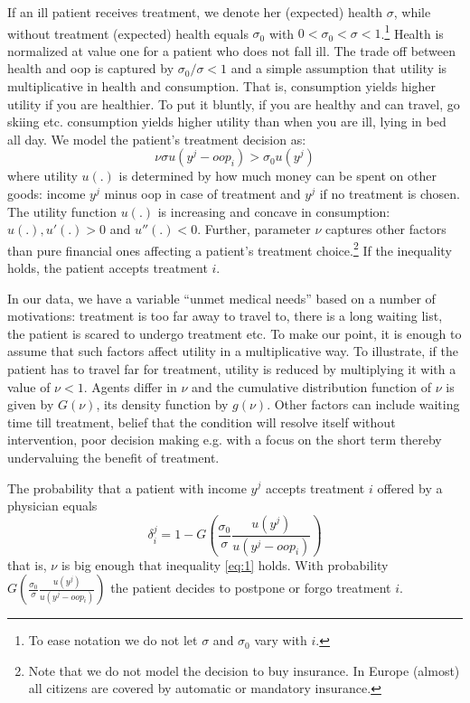 \documentclass[a4paper,12pt]{article}
\begin{document}
If an ill patient receives treatment, we denote her (expected) health \(\sigma\), while without treatment (expected) health equals \(\sigma_0\) with \(0 < \sigma_0 < \sigma < 1\).\footnote{To ease notation we do not let \(\sigma\) and \(\sigma_0\) vary with \(i\).} Health is normalized at value one for a patient who does not fall ill. The trade off between health and oop is captured by \(\sigma_0/\sigma <1\) and a simple assumption that utility is multiplicative in health and consumption. That is, consumption yields higher utility if you are healthier. To put it bluntly, if you are healthy and can travel, go skiing etc. consumption yields higher utility than when you are ill, lying in bed all day. We model the patient's treatment decision as:
\begin{equation}
\label{eq:1}
\nu \sigma u(y^j-oop_i) > \sigma_0 u(y^j)
\end{equation}
where utility \(u(.)\) is determined by how much money can be spent on other goods: income \(y^j\) minus oop in case of treatment and \(y^j\) if no treatment is chosen. The utility function \(u(.)\) is increasing and concave in consumption: \(u(.), u'(.) >0\) and \(u''(.) < 0\). Further, parameter \(\nu\) captures other factors than pure financial ones affecting a patient's treatment choice.\footnote{Note that we do not model the decision to buy insurance. In Europe (almost) all citizens are covered by automatic or mandatory insurance.} If the inequality holds, the patient accepts treatment \(i\).

In our data, we have a variable ``unmet medical needs'' based on a number of motivations: treatment is too far away to travel to, there is a long waiting list, the patient is scared to undergo treatment etc. To make our point, it is enough to assume that such factors affect utility in a multiplicative way. To illustrate, if the patient has to travel far for treatment, utility is reduced by multiplying it with a value of \(\nu < 1\). Agents differ in \(\nu\) and the cumulative distribution function of \(\nu\) is given by \(G(\nu)\), its density function by \(g(\nu)\). Other factors can include waiting time till treatment, belief that the condition will resolve itself without intervention, poor decision making e.g. with a focus on the short term thereby undervaluing the benefit of treatment.

The probability that a patient with income \(y^{j}\) accepts treatment \(i\) offered by a physician equals
\begin{equation}
\label{eq:2}
\delta_i^j = 1-G\left( \frac{\sigma_0}{\sigma} \frac{u(y^{j})}{u(y^{j}-oop_i)} \right)
\end{equation}
that is, \(\nu\) is big enough that inequality \eqref{eq:1} holds. With probability \(G\left( \frac{\sigma_0}{\sigma} \frac{u(y^{j})}{u(y^{j}-oop_i)} \right)\) the patient decides to postpone or forgo treatment \(i\).
\end{document}
